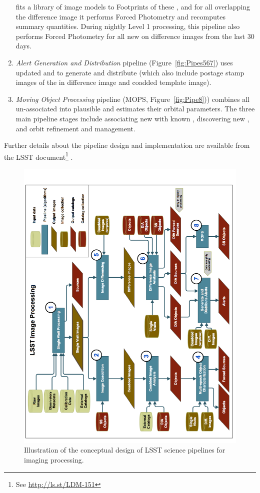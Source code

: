 \documentclass[SE,lsstdraft,toc]{lsstdoc}
\newcommand{\oldtext}[1]{{\color{red} #1}}
\newcommand{\marginreq}[1]{\marginpar{\hspace{0pt}\tiny #1}}
\newcommand{\reqparam}[1]{\marginreq{#1}}
\newcommand{\lsstdoc}[1]{{\color{blue}\citell{#1}}}
\begin{document}
\begin{enumerate}
fits a library of image models to Footprints of these \DIASources, and for all \DIAObjects
overlapping the difference image it performs Forced Photometry and recomputes summary quantities.
During nightly Level 1 processing, this pipeline also performs Forced Photometry
for all new \DIAObjects on difference images from the last 30 days\reqparam{precoveryWindow}.
\item \textit{Alert Generation and Distribution} pipeline (Figure~\ref{fig:Pipes567}) uses updated
\DIAObjects and \DIASources to generate and distribute \Alerts (which also include postage stamp
images of the \DIASource in difference image and coadded template image).
\item \textit{Moving Object Processing} pipeline (MOPS, Figure~\ref{fig:Pipe8})) combines all
un-associated \DIASources into plausible \SSObjects and estimates their orbital parameters.
The three main pipeline stages include associating new \DIASources with known \SSObjects,
discovering new \SSObjects, and orbit refinement and management.
\end{enumerate}

Further details about the pipeline design and implementation are available from the LSST
document\footnote{\oldtext{See \url{http://ls.st/LDM-151}}} \lsstdoc{LDM-151}.

\begin{figure}[!t]
    \centering
    \vskip -0.1in
    \includegraphics[scale=0.515, angle=270]{gliffy/LSSTimageProcessingDetail1}
    \vskip -0.1in
    \caption{Illustration of the conceptual design of LSST science pipelines for imaging processing.\label{fig:Detail1}}
\end{figure}
\end{document}
